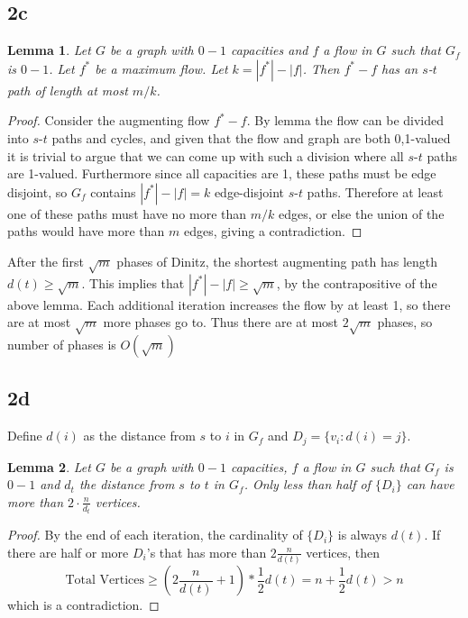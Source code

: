 \documentclass{article}
\newtheorem{lemma}{Lemma}
\begin{document}
\subsection*{2c}

\begin{lemma} Let $G$ be a graph with $0-1$ capacities and $f$ a flow in $G$
such that $G_f$ is $0-1$. Let $f^*$ be a maximum flow. Let $k=|f^*| - |f|$.
Then $f^*-f$ has an $s$-$t$ path of length at most
$m/k$. \end{lemma}
\begin{proof}
Consider the augmenting flow $f^* - f$. By lemma the flow can be divided into
$s$-$t$ paths and cycles, and given that the flow and graph are both 0,1-valued it
is trivial to argue that we can come up with such a division where all
$s$-$t$ paths are 1-valued. Furthermore since all capacities are 1, these paths
must be edge disjoint, so $G_f$ contains $|f^*| - |f| = k$ edge-disjoint $s$-$t$ 
paths. Therefore at least one of these paths must have no more than $m/k$ edges,
or else the union of the paths would have more than $m$ edges, giving a contradiction.
\end{proof}

After the first $\sqrt{m}$ phases of Dinitz, the shortest augmenting path has length
$d(t) \geq \sqrt{m}$. This implies that $|f^*| - |f| \geq \sqrt{m}$, by the
contrapositive of the above lemma. Each
additional iteration increases the flow by at least 1, so there are at most
$\sqrt{m}$ more phases go to. Thus there are at most $2\sqrt{m}$ phases,
so number of phases is $O(\sqrt{m})$

\subsection*{2d}

Define $d(i)$ as the distance from $s$ to $i$ in $G_f$ and $D_j = \{v_i: d(i) = j \}$. 
\begin{lemma} Let $G$ be a graph with $0-1$ capacities, $f$ a flow in $G$ such that 
$G_f$ is $0-1$ and $d_t$ the distance from $s$ to $t$ in $G_f$. Only less than half 
of $\{D_i\}$ can have more than $2\cdot \frac{n}{d_t}$ vertices.\end{lemma}
\begin{proof}
By the end of each iteration, the cardinality of $\{D_i\}$ is always $d(t)$. 
If there are half or more $D_i$'s that has more than $2\frac{n}{d(t)}$ vertices, 
then $$\text{Total Vertices} \geq (2\frac{n}{d(t)} + 1) * \frac{1}{2} d(t) 
= n + \frac{1}{2} d(t) > n$$ which is a contradiction. 
\end{proof}
\end{document}
